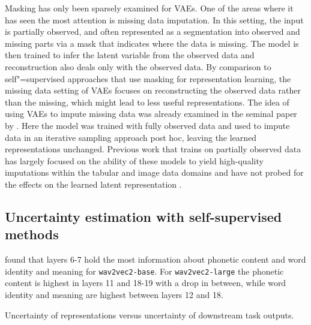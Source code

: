 Masking has only been sparsely examined for VAEs. One of the areas where it has seen the most attention is missing data imputation. In this setting, the input is partially observed, and often represented as a segmentation into observed and missing parts via a mask that indicates where the data is missing. The model is then trained to infer the latent variable from the observed data and reconstruction also deals only with the observed data. 
By comparison to self"=supervised approaches that use masking for representation learning, the missing data setting of VAEs focuses on reconstructing the observed data rather than the missing, which might lead to less useful representations. 
The idea of using VAEs to impute missing data was already examined in the seminal paper by \textcite{rezende_stochastic_2014}. Here the model was trained with fully observed data and used to impute data in an iterative sampling approach post hoc, leaving the learned representations unchanged.
Previous work that trains on partially observed data has largely focused on the ability of these models to yield high-quality imputations within the tabular and image data domains and have not probed for the effects on the learned latent representation \parencite{mattei_miwae_2019, ipsen_not-miwae_2021}. 



\subsection{Uncertainty estimation with self-supervised methods}
%

\textcite{pasad_layerwise_2021} found that layers 6-7 hold the most information about phonetic content and word identity and meaning for \texttt{wav2vec2-base}. 
For \texttt{wav2vec2-large} the phonetic content is highest in layers 11 and 18-19 with a drop in between, while word identity and meaning are highest between layers 12 and 18. 


Uncertainty of representations versus uncertainty of downstream task outputs. 








